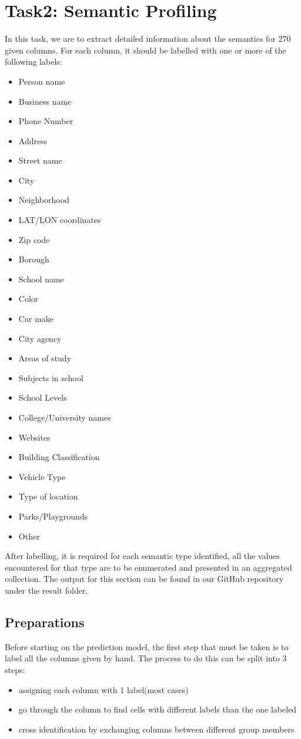 \documentclass[sigconf]{acmart}
\begin{document}
\section{Task2: Semantic Profiling}
In this task, we are to extract detailed information about the semantics for 270 given columns. For each column, it should be labelled with one or more of the following labels:
\begin{itemize}
\item Person name
\item Business name
\item Phone Number
\item Address
\item Street name
\item City
\item Neighborhood
\item LAT/LON coordinates
\item Zip code
\item Borough
\item School name
\item Color
\item Car make
\item City agency
\item Areas of study
\item Subjects in school
\item School Levels
\item College/University names
\item Websites
\item Building Classification
\item Vehicle Type
\item Type of location
\item Parks/Playgrounds
\item Other
\end{itemize}
After labelling, it is required for each semantic type identified, all the values encountered for that type are to be enumerated and presented in an aggregated collection. The output for this section can be found in our GitHub repository under the result folder.
\subsection{Preparations}
Before starting on the prediction model, the first step that must be taken is to label all the columns given by hand. The process to do this can be split into 3 steps:
\begin{itemize}
\item assigning each column with 1 label(most cases)
\item go through the column to find cells with different labels than the one labeled
\item cross identification by exchanging columns between different group members
\end{itemize}
\end{document}
